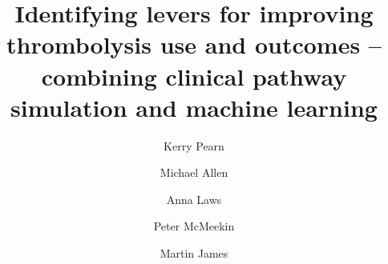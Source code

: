 \title{Identifying levers for improving thrombolysis use and outcomes – combining clinical pathway simulation and machine learning}


\renewcommand{\thefootnote}{\fnsymbol{footnote}}
\author[1,2]{Kerry Pearn}
\author[*1,2]{Michael Allen}
\author[1,2]{Anna Laws}
\author[3]{Peter McMeekin}
\author[1,2]{Martin James}

